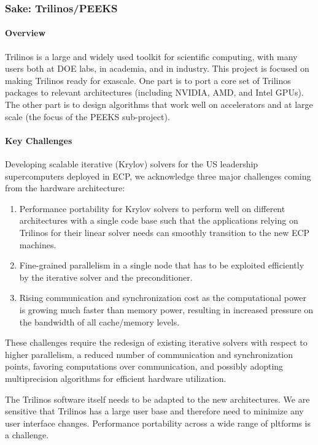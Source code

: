 \subsubsection{ Sake: Trilinos/PEEKS} \label{subsubsect:trilinos}
\paragraph{Overview} 
Trilinos is a large and widely used toolkit for scientific computing, with many users both at DOE labs, in academia, and in industry. 
This project is focused on making Trilinos ready for exascale. One part is to port a core set of Trilinos packages to relevant architectures 
(including NVIDIA, AMD, and Intel GPUs). The other part is to design algorithms that work well on accelerators and at large scale (the focus of 
the PEEKS sub-project).


\paragraph{Key  Challenges}
Developing scalable iterative (Krylov) solvers for the US leadership supercomputers 
deployed in ECP, we acknowledge three major challenges coming from the hardware 
architecture:
\begin{enumerate}
\item 
Performance portability for Krylov solvers to perform well on different architectures with a single code base
such that the applications relying on Trilinos for their linear solver needs can smoothly transition to 
the new ECP machines.
\item 
Fine-grained parallelism in a single node that has to be exploited efficiently 
by the iterative solver and the preconditioner.
\item
Rising communication and synchronization cost as the
computational power is growing much faster than memory power, resulting in 
increased pressure on the bandwidth of all cache/memory levels.
\end{enumerate}

These challenges require the redesign of existing iterative solvers with respect 
to higher parallelism, a reduced number of 
communication and synchronization points, favoring computations over 
communication, and possibly adopting multiprecision algorithms for efficient hardware 
utilization. 

The Trilinos software itself needs to be adapted to the new architectures. We are sensitive that Trilinos has a large user base and therefore need to minimize any user interface changes. Performance portability across a wide range of pltforms is a challenge.

